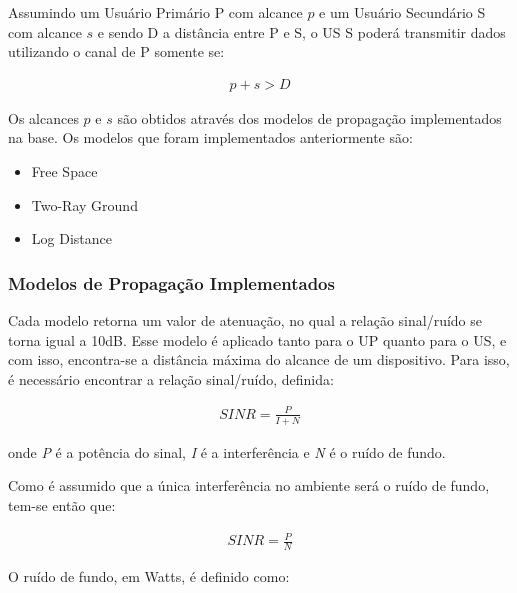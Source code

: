 Assumindo um Usuário Primário P com alcance \begin{math}p\end{math} e um Usuário Secundário S com alcance \begin{math}s\end{math} e sendo D a distância entre P e S, o US S poderá transmitir dados utilizando o canal de P somente se:

\begin{align}
  \label{cantransmitdata} p + s > D
\end{align}

Os alcances \begin{math} p \end{math} e \begin{math} s \end{math} são obtidos através dos modelos de propagação implementados na base. Os modelos que foram implementados anteriormente são: 

\begin{itemize}
\item Free Space
\item Two-Ray Ground
\item Log Distance
\end{itemize}

\subsubsection{Modelos de Propagação Implementados}

Cada modelo retorna um valor de atenuação, no qual a relação sinal/ruído se torna igual a 10dB. Esse modelo é aplicado tanto para o UP quanto para o US, e com isso, encontra-se a distância máxima do alcance de um dispositivo. Para isso, é necessário encontrar a relação sinal/ruído, definida:

\begin{align}
  \label{Sinr} SINR=\frac{P}{I+N}
\end{align}

onde \textit{P} é a potência do sinal, \textit{I} é a interferência e \textit{N} é o ruído de fundo.

Como é assumido que a única interferência no ambiente será o ruído de fundo, tem-se então que:

\begin{align}
  \label{actSinr} SINR=\frac{P}{N}
\end{align}

O ruído de fundo, em Watts, é definido como:

